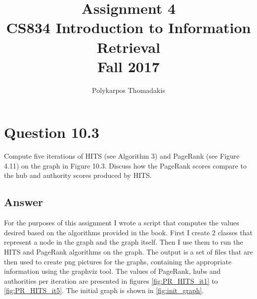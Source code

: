 \documentclass{article}
\author{Polykarpos Thomadakis}
\title{Assignment 4 \\
	\large CS834 Introduction to Information Retrieval\\Fall 2017}
\begin{document}
\maketitle
\section*{Question 10.3}
Compute five iterations of HITS (see Algorithm 3) and PageRank (see Figure 4.11) on the graph in Figure 10.3. Discuss how the PageRank scores compare to the hub and authority scores produced by HITS.
\subsection*{Answer}
For the purposes of this assignment I wrote a script that computes the values desired based on the algorithms provided in the book. First I create 2 classes that represent a node in the graph and the graph itself. Then I use them to run the HITS and PageRank algorithms on the graph. The output is a set of files that are then used to create png pictures for the graphs, containing the appropriate information using the graphviz tool. The values of PageRank, hubs and authorities per iteration are presented in figures \ref{fig:PR_HITS_it1} to \ref{fig:PR_HITS_it5}. The initial graph is shown in \ref{fig:init_graph}.
\end{document}
